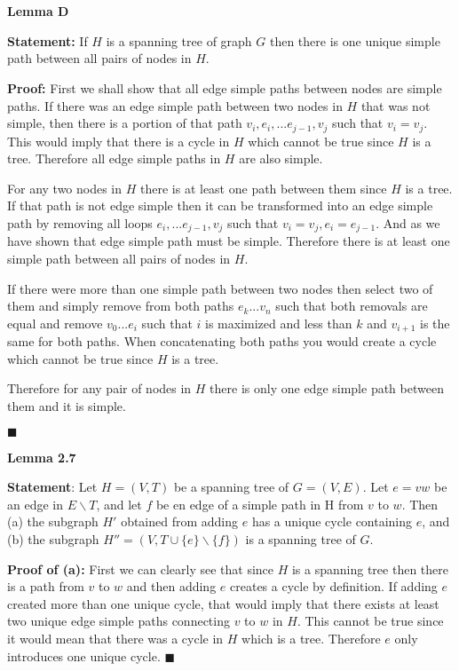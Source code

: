 \documentclass{article}
\newcommand*{\QEDA}{\hfill\ensuremath{\blacksquare}}%
\begin{document}
\section{}
\textbf{Lemma D}

\textbf{Statement:} If $H$ is a spanning tree of graph $G$ then there is one unique simple path between all pairs of nodes in $H$.

\textbf{Proof:} 
First we shall show that all edge simple paths between nodes are simple paths. If there was an edge simple path between two nodes in $H$ that was not simple, then there is a portion of that path $v_i, e_i, ... e_{j-1}, v_j$ such that $v_i = v_j$. This would imply that there is a cycle in $H$ which cannot be true since $H$ is a tree. Therefore all edge simple paths in $H$ are also simple. 

For any two nodes in $H$ there is at least one path between them since $H$ is a tree. If that path is not edge simple then it can be transformed into an edge simple path by removing all loops $e_i, ... e_{j-1}, v_j$ such that $v_i = v_j, e_i = e_{j-1}$. And as we have shown that edge simple path must be simple. Therefore there is at least one simple path between all pairs of nodes in $H$. 

If there were more than one simple path between two nodes then select two of them and simply remove from both paths $e_k...v_n$ such that both removals are equal and remove $v_0...e_i$ such that $i$ is maximized and less than $k$ and $v_{i+1}$ is the same for both paths. When concatenating both paths you would create a cycle which cannot be true since $H$ is a tree. 

Therefore for any pair of nodes in $H$ there is only one edge simple path between them and it is simple.

\QEDA


\textbf{Lemma 2.7}

\textbf{Statement}: Let $H = (V,T)$ be a spanning tree of $G = (V,E)$. Let $e = vw$ be an edge in $E \backslash T$, and let $f$ be en edge of a simple path in H from $v$ to $w$. Then (a) the subgraph $H'$ obtained from adding $e$ has a unique cycle containing $e$, and (b) the subgraph $H'' = (V,T \cup \{e\} \backslash \{f\})$ is a spanning tree of $G$.

\textbf{Proof of (a):} First we can clearly see that since $H$ is a spanning tree then there is a path from $v$ to $w$ and then adding $e$ creates a cycle by definition. If adding $e$ created more than one unique cycle, that would imply that there exists at least two unique edge simple paths connecting $v$ to $w$ in $H$. This cannot be true since it would mean that there was a cycle in $H$ which is a tree. Therefore $e$ only introduces one unique cycle.
\QEDA 
\end{document}
